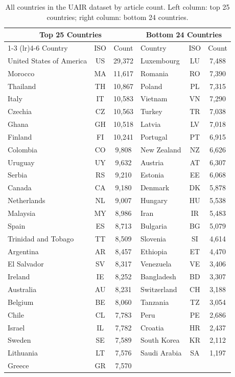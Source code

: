 \begin{table}[htbp]
    \centering
    \caption{All countries in the UAIR dataset by article count. Left column: top 25 countries; right column: bottom 24 countries.}
    \label{tab:country_article_counts_all}
    \begin{tabular}{lcc|lcc}
        \toprule
        \multicolumn{3}{c|}{\textbf{Top 25 Countries}} & \multicolumn{3}{c}{\textbf{Bottom 24 Countries}} \\
        \cmidrule(lr){1-3} \cmidrule(lr){4-6}
        Country & ISO & Count & Country & ISO & Count \\
        \midrule
        United States of America & US & 29,372 & Luxembourg & LU & 7,488 \\
        Morocco & MA & 11,617 & Romania & RO & 7,390 \\
        Thailand & TH & 10,867 & Poland & PL & 7,315 \\
        Italy & IT & 10,583 & Vietnam & VN & 7,290 \\
        Czechia & CZ & 10,563 & Turkey & TR & 7,038 \\
        Ghana & GH & 10,518 & Latvia & LV & 7,018 \\
        Finland & FI & 10,241 & Portugal & PT & 6,915 \\
        Colombia & CO & 9,808 & New Zealand & NZ & 6,626 \\
        Uruguay & UY & 9,632 & Austria & AT & 6,307 \\
        Serbia & RS & 9,210 & Estonia & EE & 6,068 \\
        Canada & CA & 9,180 & Denmark & DK & 5,878 \\
        Netherlands & NL & 9,007 & Hungary & HU & 5,538 \\
        Malaysia & MY & 8,986 & Iran & IR & 5,483 \\
        Spain & ES & 8,713 & Bulgaria & BG & 5,079 \\
        Trinidad and Tobago & TT & 8,509 & Slovenia & SI & 4,614 \\
        Argentina & AR & 8,457 & Ethiopia & ET & 4,470 \\
        El Salvador & SV & 8,317 & Venezuela & VE & 3,406 \\
        Ireland & IE & 8,252 & Bangladesh & BD & 3,307 \\
        Australia & AU & 8,231 & Switzerland & CH & 3,188 \\
        Belgium & BE & 8,060 & Tanzania & TZ & 3,054 \\
        Chile & CL & 7,783 & Peru & PE & 2,686 \\
        Israel & IL & 7,782 & Croatia & HR & 2,437 \\
        Sweden & SE & 7,589 & South Korea & KR & 2,112 \\
        Lithuania & LT & 7,576 & Saudi Arabia & SA & 1,197 \\
        Greece & GR & 7,570 &  & & \\
        \bottomrule
    \end{tabular}
\end{table}